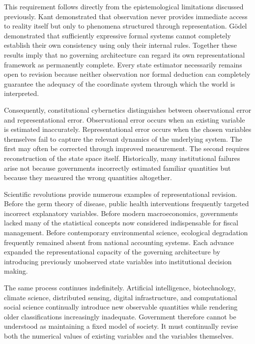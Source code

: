 \documentclass[12pt,a4paper]{article}
\begin{document}
This requirement follows directly from the epistemological limitations discussed previously. Kant demonstrated that observation never provides immediate access to reality itself but only to phenomena structured through representation. Gödel demonstrated that sufficiently expressive formal systems cannot completely establish their own consistency using only their internal rules. Together these results imply that no governing architecture can regard its own representational framework as permanently complete. Every state estimator necessarily remains open to revision because neither observation nor formal deduction can completely guarantee the adequacy of the coordinate system through which the world is interpreted.

Consequently, constitutional cybernetics distinguishes between observational error and representational error. Observational error occurs when an existing variable is estimated inaccurately. Representational error occurs when the chosen variables themselves fail to capture the relevant dynamics of the underlying system. The first may often be corrected through improved measurement. The second requires reconstruction of the state space itself. Historically, many institutional failures arise not because governments incorrectly estimated familiar quantities but because they measured the wrong quantities altogether.

Scientific revolutions provide numerous examples of representational revision. Before the germ theory of disease, public health interventions frequently targeted incorrect explanatory variables. Before modern macroeconomics, governments lacked many of the statistical concepts now considered indispensable for fiscal management. Before contemporary environmental science, ecological degradation frequently remained absent from national accounting systems. Each advance expanded the representational capacity of the governing architecture by introducing previously unobserved state variables into institutional decision making.

The same process continues indefinitely. Artificial intelligence, biotechnology, climate science, distributed sensing, digital infrastructure, and computational social science continually introduce new observable quantities while rendering older classifications increasingly inadequate. Government therefore cannot be understood as maintaining a fixed model of society. It must continually revise both the numerical values of existing variables and the variables themselves.
\end{document}
